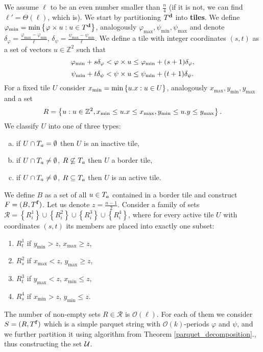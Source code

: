 \documentclass[11pt]{article}
\newcommand{\Z}{\mathbb{Z}}
\renewcommand{\O}{\mathcal{O}}
\renewcommand{\phi}{\varphi}
\newcommand{\set}[1]{\left\lbrace #1 \right\rbrace}
\theoremstyle{plain}
\theoremstyle{definition}
\theoremstyle{remark}
\begin{document}
We assume $\ell$ to be an even number smaller than $\frac{n}{4}$ (if it is not, we can find $\ell' = \Theta(\ell)$, which is). 
We start by partitioning $T^\mathbf{d}$ into \textbf{tiles}.
We define $\phi_{\min} = \min \set{\h{u} : u \in \d{T}}$, analogously $\phi_{\max}, \psi_{\min}, \psi_{\max}$ and denote $\delta_{\phi} = \frac{\phi_{\max} - \phi_{\min}}{\ell}$, $\delta_{\psi} = \frac{\psi_{\max} - \psi_{\min}}{\ell}$.
We define a tile with integer coordinates $(s, t)$ as a set of vectors $u \in \Z^2$ such that
$$ \phi_{\min} + s \delta_{\phi} < \h{u} \le \phi_{\min} + (s + 1)\delta_{\phi}, $$ 
$$ \psi_{\min} + t \delta_{\psi} < \psi \times u \le \psi_{\min} + (t + 1)\delta_{\psi}. $$
For a fixed tile $U$ consider $x_{\min} = \min \set{\x{u} : u \in U}$, analogously $x_{\max}, y_{\min}, y_{\max}$ and a set
$$ R = \set{u : u \in \Z^2, x_{\min} \le \x{u} \le x_{\max}, y_{\min} \le \y{u} \le y_{\max}}. $$
We classify $U$ into one of three types:
\begin{enumerate}[a)]
	\item if $U \cap T_a = \emptyset$ then $U$ is an inactive tile,
	\item if $U \cap T_a \neq \emptyset$, $R \not \subseteq T_a$ then $U$ a border tile,
	\item if $U \cap T_a \neq \emptyset$, $R \subseteq T_a$ then $U$ is an active tile.
\end{enumerate}
We define $B$ as a set of all $u \in T_a$ contained in a border tile and construct $F = (B, T^\mathbf{f})$.
Let us denote $z = \frac{n - 1}{2}$.
Consider a family of sets $\mathcal{R} = \set{R^1_i} \cup \set{R^2_i} \cup \set{R^3_i} \cup \set{R^4_i}$,
where for every active tile $U$ with coordinates $(s, t)$ its members are placed into exactly one subset:
\begin{enumerate}[1)]
	\item $R^1_{t}$ if $y_{\min} > z$, $x_{\max} \ge z$,
	\item $R^2_{s}$ if $x_{\max} < z$, $y_{\max} \ge z$,
	\item $R^3_{t}$ if $y_{\max} < z$, $x_{\min} \le z$,
	\item $R^4_{s}$ if $x_{\min} > z$, $y_{\min} \le z$.
\end{enumerate}
The number of non-empty sets $R \in \mathcal{R}$ is $\O(\ell)$.
For each of them we consider $S = (R, T^\mathbf{f})$ which is a simple parquet string with $\O(k)$-periods $\phi$ and $\psi$,
and we further partition it using algorithm from Theorem \ref{parquet_decomposition}., thus constructing the set $\mathcal{U}$.
\end{document}
